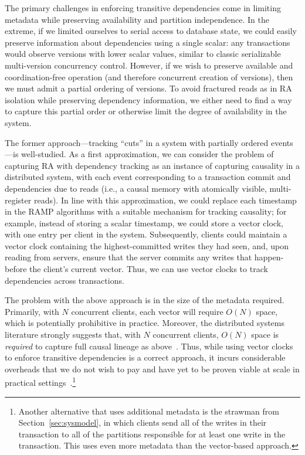 
The primary challenges in enforcing transitive dependencies come in limiting metadata while preserving availability and partition independence. In the extreme, if we limited ourselves to serial access to database state, we could easily preserve information about dependencies using a single scalar: any transactions would observe versions with lower scalar values, similar to classic serializable multi-version concurrency control. However, if we wish to preserve available and coordination-free operation (and therefore concurrent creation of versions), then we must admit a partial ordering of versions. To avoid fractured reads as in RA isolation while preserving dependency information, we either need to find a way to capture this partial order or otherwise limit the degree of availability in the system.

 The former approach---tracking ``cuts'' in a system with partially ordered events---is well-studied. As a first approximation, we can consider the problem of capturing RA with dependency tracking as an instance of capturing causality in a distributed system, with each event corresponding to a transaction commit and dependencies due to reads (i.e., a causal memory with atomically visible, multi-register reads). In line with this approximation, we could replace each timestamp in the RAMP algorithms with a suitable mechanism for tracking causality; for example, instead of storing a scalar timestamp, we could store a vector clock, with one entry per client in the system. Subsequently, clients could maintain a vector clock containing the highest-committed writes they had seen, and, upon reading from servers, ensure that the server commits any writes that happen-before the client's current vector. Thus, we can use vector clocks to track dependencies across transactions.

The problem with the above approach is in the size of the metadata required. Primarily, with $N$ concurrent clients, each vector will require $O(N)$ space, which is potentially prohibitive in practice. Moreover, the distributed systems literature strongly suggests that, with $N$ concurrent clients, $O(N)$ space is \textit{required} to capture full causal lineage as above~\cite{vc-lowerbound}. Thus, while using vector clocks to enforce transitive dependencies is a correct approach, it incurs considerable overheads that we do not wish to pay and have yet to be proven viable at scale in practical settings~\cite{explicit-socc}.\footnote{Another alternative that uses additional metadata is the strawman from Section~\ref{sec:sysmodel}, in which clients send all of the writes in their transaction to all of the partitions responsible for at least one write in the transaction. This uses even more metadata than the vector-based approach.}

